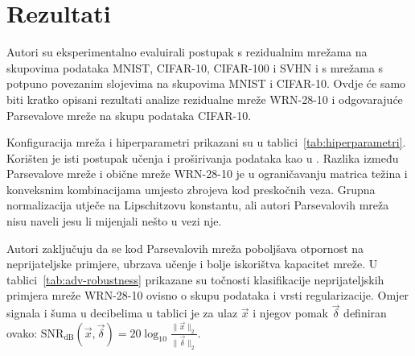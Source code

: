 \documentclass[utf8, seminar, numeric, lmodern]{feri}
\begin{document}
\section{Rezultati}

Autori su eksperimentalno evaluirali postupak s rezidualnim mrežama \cite{he15-resnet,he16-resnet-imdrn,zagoruyko16-wrn} na skupovima podataka MNIST, CIFAR-10, CIFAR-100 i SVHN i s mrežama s potpuno povezanim slojevima na skupovima MNIST i CIFAR-10. Ovdje će samo biti kratko opisani rezultati analize rezidualne mreže WRN-28-10 \cite{zagoruyko16-wrn} i odgovarajuće Parsevalove mreže na skupu podataka CIFAR-10.

Konfiguracija mreža i hiperparametri prikazani su u tablici~\ref{tab:hiperparametri}. Korišten je isti postupak učenja i proširivanja podataka kao u \cite{zagoruyko16-wrn}. Razlika između Parsevalove mreže i obične mreže WRN-28-10 je u ograničavanju matrica težina i konveksnim kombinacijama umjesto zbrojeva kod preskočnih veza. Grupna normalizacija utječe na Lipschitzovu konstantu, ali autori Parsevalovih mreža nisu naveli jesu li mijenjali nešto u vezi nje.

Autori zaključuju da se kod Parsevalovih mreža poboljšava otpornost na neprijateljske primjere, ubrzava učenje i bolje iskorištva kapacitet mreže. U tablici~\ref{tab:adv-robustness} prikazane su točnosti klasifikacije neprijateljskih primjera mreže WRN-28-10 ovisno o skupu podataka i vrsti regularizacije. Omjer signala i šuma u decibelima u tablici je za ulaz $\vec x$ i njegov pomak $\vec \delta$ definiran ovako: $\mathrm{SNR}_\mathrm{dB}(\vec x, \vec{\delta}) = 20 \log_{10} \frac{\lVert \vec x\rVert_2}{\lVert\vec \delta\rVert_2}$.
\end{document}
